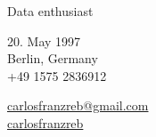 \documentclass[]{commands}
\begin{document}
      {Data enthusiast}
      
\vspace{0.3cm}   
\color{lightgray}\noindent\makebox[\textwidth]{\rule{\paperwidth-0.4cm}{2.5pt}}

\begin{info}
    \begin{flushleft}
    \small{20. May 1997}\hfill{\faCalendar}\\

    \small{Berlin, Germany}\hfill{\faMapMarker}\\
    
    {\small +49 1575 2836912}\hfill{\Mobilefone}\\

    \vspace{1mm}
    
    \href{mailto:carlosfranzreb@gmail.com}{\small{carlosfranzreb@gmail.com}\hfill{\Large\Letter}\hspace{0.6mm}{\small \faMousePointer}}\\
    
    \href{https://github.com/carlosfranzreb}{\small{carlosfranzreb}\hfill{\Large\faGithub}\hspace{0.6mm}{\small \faMousePointer}}\\
    
    \end{flushleft}
\end{info}
\end{document}
